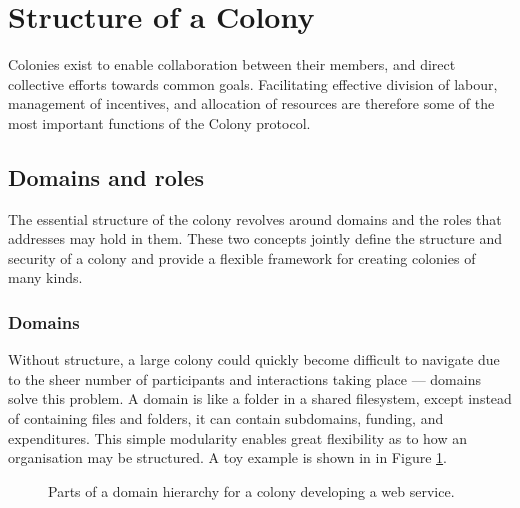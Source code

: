 \section{Structure of a Colony}\label{sec:colony-structure}
Colonies exist to enable collaboration between their members, and direct collective efforts towards common goals. Facilitating effective division of labour, management of incentives, and allocation of resources are therefore some of the most important functions of the Colony protocol.

\subsection{Domains and roles}\label{sec:domains}\label{sec:roles}

The essential structure of the colony revolves around domains and the roles that addresses may hold in them. These two concepts jointly define the structure and security of a colony and provide a flexible framework for creating colonies of many kinds.

\subsubsection{Domains}

Without structure, a large colony could quickly become difficult to navigate due to the sheer number of participants and interactions taking place --- domains solve this problem. A domain is like a folder in a shared filesystem, except instead of containing files and folders, it can contain subdomains, funding, and expenditures. This simple modularity enables great flexibility as to how an organisation may be structured. A toy example is shown in in Figure \ref{fig:domainhierarchysample}.

\begin{figure}[h]
    \centering
 \caption{Parts of a domain hierarchy for a colony developing a web service.}
 \label{fig:domainhierarchysample}

\end{figure}

